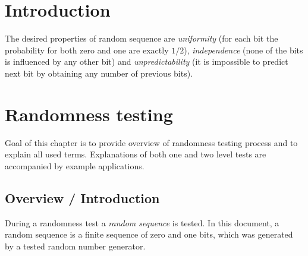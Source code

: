 \documentclass[
  digital,     %
  oneside,     %
  nosansbold,  %
  nocolorbold, %
  nolof,         %
  nolot,         %
]{fithesis4}
\begin{document}
\chapter*{Introduction}


The desired properties of random sequence are \emph{uniformity} (for each bit the probability for both zero and one are exactly $1/2$), \emph{independence} (none of the bits is influenced by any other bit) and \emph{unpredictability} (it is impossible to predict next bit by obtaining any number of previous bits). \cite[p. 1-1]{nist_special}


\chapter{Randomness testing}

Goal of this chapter is to provide overview of randomness testing process and to explain all used terms. Explanations of both one and two level tests are accompanied by example applications.

\section{Overview / Introduction} \label{chap:rand-intro}


During a randomness test a \emph{random sequence} is tested. In this document, a random sequence is a finite sequence of zero and one bits, which was generated by a tested random number generator.  \cite[p. 1-1]{nist_special} 
\end{document}
